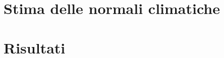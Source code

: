 
\section{Stima delle normali climatiche}\label{ch:clino}


\section{Risultati}\label{ch:risultati}

